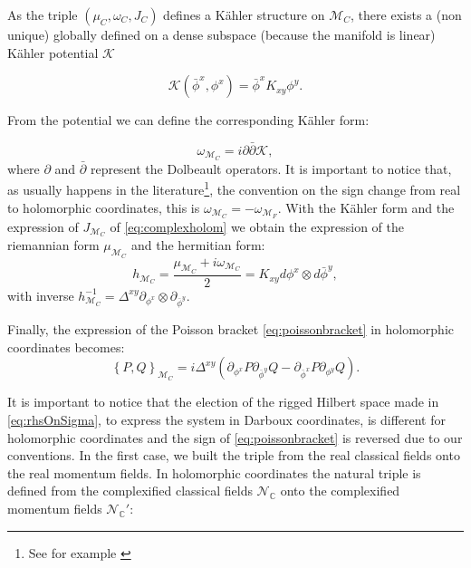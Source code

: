 \documentclass[12pt]{article}%
\begin{document}
As the triple $(\mu_C, \omega_C, J_C)$ defines a Kähler structure on $\mathcal{M}_C$, there exists
a (non unique) globally defined on a dense subspace (because the manifold is linear) Kähler potential  $\mathcal{K}$

\begin{equation}
\label{eq:kahlerpotential}
\mathcal{K}(\bar \phi^x, \phi^x)=\bar \phi^x  K_{xy} \phi^y .
\end{equation}



From the potential we can define the corresponding  Kähler form:

\begin{equation}
\label{eq:kahlerform}
\omega_{\mathcal{M}_C}= i\partial \bar \partial \mathcal{K},
\end{equation}
where $\partial$ and $\bar \partial$ represent the Dolbeault operators. It is important to notice that, as usually happens in the literature\footnote{See for example \cite{Woodhouse1997}}, the convention on the sign change from real to holomorphic coordinates, this is $\omega_{\mathcal{M}_C}=-\omega_{\mathcal{M}_F}$. With the Kähler form and the expression of $J_{\mathcal{M}_C}$ of \eqref{eq:complexholom} we obtain the expression of the riemannian form $\mu_{\mathcal{M}_C}$ and the hermitian form: $$h_{\mathcal{M}_C}= \frac{\mu_{\mathcal{M}_C}+i\omega_{\mathcal{M}_C}}{2}= K_{xy}d\phi^x\otimes d\bar{\phi}^y,$$ 
with inverse $h^{-1}_{\mathcal{M}_C}=\Delta^{xy}\partial_{\phi^x}\otimes\partial_{\bar\phi^y}$.

Finally, the expression of the Poisson bracket \eqref{eq:poissonbracket} in holomorphic coordinates becomes:
\begin{equation}
\label{eq:poissonHol}
\left\{P,Q\right\}_{\mathcal{M}_C}=
i\Delta^{xy}\left( \partial_{\phi^x}P\partial_{\bar\phi^y}Q-\partial_{\bar\phi^x}P\partial_{\phi^y}Q \right).
\end{equation}


It is important to notice that the election of the rigged Hilbert space made in \eqref{eq:rhsOnSigma}, to express the system in Darboux coordinates, is different for holomorphic coordinates and the sign of \eqref{eq:poissonbracket} is reversed due to our conventions. In the first case, we built the triple from the real classical fields onto the real momentum fields. In holomorphic coordinates the natural triple is defined from the complexified classical fields 
$\mathcal{N}_{\mathbb{C}}$ onto the complexified momentum fields $\mathcal{N}_{\mathbb{C}}'$:
\end{document}
